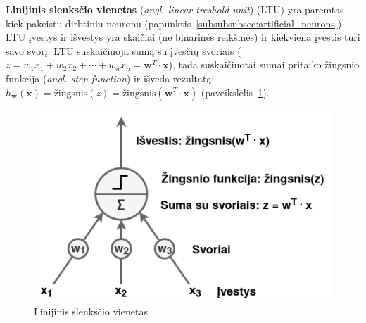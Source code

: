 \documentclass{VUMIFPSbakalaurinis}
\begin{document}
{
	\textbf{Linijinis slenksčio vienetas} (\textit{angl. linear treshold unit}) (LTU) yra paremtas kiek pakeistu dirbtiniu neuronu (papunktis~\ref{subsubsubsec:artificial_neurons}). LTU įvestys ir išvestys yra skaičiai (ne binarinės reikšmės) ir kiekviena įvestis turi savo svorį. LTU suskaičiuoja sumą su įvesčių svoriais (\(z = w_1 x_1 + w_2 x_2 + \cdots + w_n x_n = \mathbf{w}^T \cdot \mathbf{x} \)), tada suskaičiuotai sumai pritaiko žingsnio funkcija (\textit{angl. step function}) ir išveda rezultatą: \(h_\mathbf{w}(\mathbf{x}) = \textrm{žingsnis}(z) = \textrm{žingsnis}(\mathbf{w}^T \cdot \mathbf{x})\) (paveikslėlis~\ref{img:ltu}).
	
	\begin{figure}[H]
		\centering
		\includegraphics[scale=0.5]{img/ltu}
		\caption{Linijinis slenksčio vienetas}
		\label{img:ltu}
	\end{figure} 
}
\label{subsubsubsec:additional_neurons}
\end{document}
